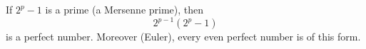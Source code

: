 If $2^p - 1$ is a prime (a Mersenne prime), then
$$2^{p-1}(2^p - 1)$$
is a perfect number. Moreover (Euler), every even perfect number is of this form.
